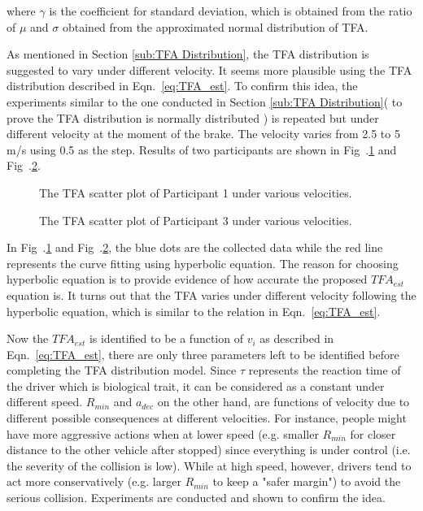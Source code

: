 \noindent where $\gamma$ is the coefficient for standard deviation, which is obtained from the ratio of $\mu$ and $\sigma$ obtained from the approximated normal distribution of TFA. 

As mentioned in Section \ref{sub:TFA Distribution}, the TFA distribution is suggested to vary under different velocity. It seems more plausible using the TFA distribution described in Eqn.~\ref{eq:TFA_est}. To confirm this idea, the experiments similar to the one conducted in Section \ref{sub:TFA Distribution}( to prove the TFA distribution is normally distributed ) is repeated but under different velocity at the moment of the brake. The velocity varies from 2.5 to 5 m/s using 0.5 as the step. Results of two participants are shown in Fig~.\ref{fig:Par1TFADifSpeed} and Fig~.\ref{fig:Par3TFADifSpeed}.

\begin{figure}[htbp!]
\begin{center}
\end{center}
\caption{The TFA scatter plot of Participant 1 under various velocities.}
\label{fig:Par1TFADifSpeed} 
\end{figure}

\begin{figure}[htbp!]
\begin{center}
\end{center}
\caption{The TFA scatter plot of Participant 3 under various velocities.}
\label{fig:Par3TFADifSpeed} 
\end{figure}

In Fig~.\ref{fig:Par1TFADifSpeed} and Fig~.\ref{fig:Par3TFADifSpeed}, the blue dots are the collected data while the red line represents the curve fitting using hyperbolic equation. The reason for choosing hyperbolic equation is to provide evidence of how accurate the proposed $TFA_{est}$ equation is. It turns out that the TFA varies under different velocity following the hyperbolic equation, which is similar to the relation in Eqn.~\ref{eq:TFA_est}.

Now the ${TFA}_{est}$ is identified to be a function of ${v_i}$ as described in Eqn.~\ref{eq:TFA_est}, there are only three parameters left to be identified before completing the TFA distribution model. Since $\tau$ represents the reaction time of the driver which is biological trait, it can be considered as a constant under different speed. $R_{min}$ and $a_{dec}$ on the other hand, are functions of velocity due to different possible consequences at different velocities. For instance, people might have more aggressive actions when at lower speed (e.g. smaller $R_{min}$ for closer distance to the other vehicle after stopped) since everything is under control (i.e. the severity of the collision is low). While at high speed, however, drivers tend to act more conservatively (e.g. larger $R_{min}$ to keep a "safer margin") to avoid the serious collision. Experiments are conducted and shown to confirm the idea.

